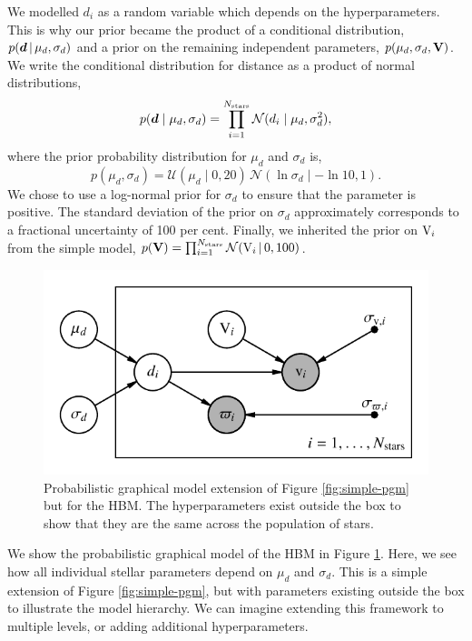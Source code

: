 We modelled \(d_i\) as a random variable which depends on the hyperparameters. This is why our prior became the product of a conditional distribution, \(p(\bm{d} \,|\, \mu_d, \sigma_d)\) and a prior on the remaining independent parameters, \(p(\mu_d, \sigma_d, \bm{\mathrm{V}})\). We write the conditional distribution for distance as a product of normal distributions,
%
\begin{equation}
    p(\bm{d} \mid \mu_d, \sigma_d) = \prod_{i=1}^{N_\mathrm{stars}} \mathcal{N}(d_i \mid \mu_d, \sigma_d^2),
\end{equation}
%
where the prior probability distribution for \(\mu_d\) and \(\sigma_d\) is,
%
\begin{equation}
    p(\mu_d, \sigma_d) = \mathcal{U}(\mu_d \mid 0, 20) \, \mathcal{N}(\ln\sigma_d \mid - \ln 10, 1).
\end{equation}
%
We chose to use a log-normal prior for \(\sigma_d\) to ensure that the parameter is positive. The standard deviation of the prior on \(\sigma_d\) approximately corresponds to a fractional uncertainty of 100 per cent. Finally, we inherited the prior on \(\mathrm{V}_i\) from the simple model, \(p(\bm{\mathrm{V}}) = \prod_{i=1}^{N_\mathrm{stars}} \mathcal{N}(\mathrm{V}_i \,|\, 0, 100)\).

\begin{figure}[tb]
    \centering
    \includegraphics{figures/hbm-pgm.pdf}
    \caption[Probabilistic graphical model for the hierarchical model]{Probabilistic graphical model extension of Figure \ref{fig:simple-pgm} but for the HBM. The hyperparameters exist outside the box to show that they are the same across the population of stars.}
    \label{fig:hbm-pgm}
\end{figure}

We show the probabilistic graphical model of the HBM in Figure \ref{fig:hbm-pgm}. Here, we see how all individual stellar parameters depend on \(\mu_d\) and \(\sigma_d\). This is a simple extension of Figure \ref{fig:simple-pgm}, but with parameters existing outside the box to illustrate the model hierarchy. We can imagine extending this framework to multiple levels, or adding additional hyperparameters.

